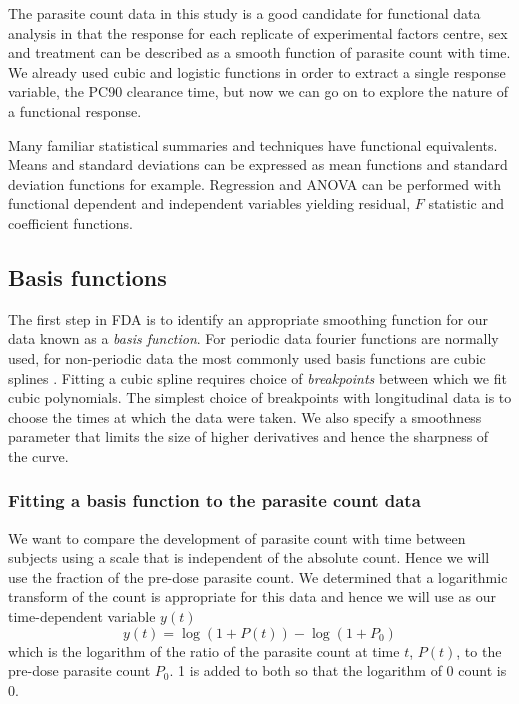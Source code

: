The parasite count data in this study is a good candidate for functional data analysis in that the response for each replicate of experimental factors centre, sex and treatment can be described as a smooth function of parasite count with time. We already used cubic and logistic functions in order to extract a single response variable, the PC90 clearance time, but now we can go on to explore the nature of a functional response.

Many familiar statistical summaries and techniques have functional equivalents. Means and standard deviations can be expressed as mean functions and standard deviation functions for example. Regression and ANOVA can be performed with functional dependent and independent variables yielding residual, $F$ statistic and coefficient functions.

\subsection{Basis functions}
The first step in FDA is to identify an appropriate smoothing function for our data known as a \emph{basis function}. For periodic data fourier functions are normally used, for non-periodic data the most commonly used basis functions are cubic splines \cite{fdaweb}. Fitting a cubic spline requires choice of \emph{breakpoints} between which we fit cubic polynomials. The simplest choice of breakpoints with longitudinal data is to choose the times at which the data were taken. We also specify a smoothness parameter that limits the size of higher derivatives and hence the sharpness of the curve.

\subsubsection*{Fitting a basis function to the parasite count data}
We want to compare the development of parasite count with time between subjects using a scale that is independent of the absolute count. Hence we will use the fraction of the pre-dose parasite count. We determined that a logarithmic transform of the count is appropriate for this data and hence we will use as our time-dependent variable $y(t)$
$$y(t)=\log (1+P(t))-\log(1+P_{0})$$
which is the logarithm of the ratio of the parasite count at time $t$, $P(t)$, to the pre-dose parasite count $P_{0}$. 1 is added to both so that the logarithm of 0 count is 0.

